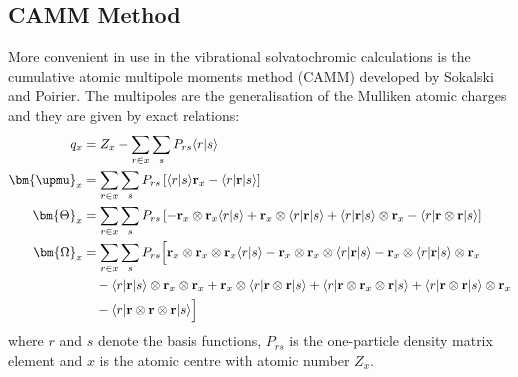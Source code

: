 \documentclass[a4paper,titlepage,twoside,fleqn,12pt]{book}
\begin{document}
\begin{appendices}
\begin{refsection}
\section{CAMM Method}

More convenient in use in the vibrational solvatochromic calculations
is the cumulative atomic multipole
moments method (CAMM) developed by Sokalski and Poirier. \citep{Sokalski.Poirier.CPL.1983}
The multipoles are the generalisation of the Mulliken atomic charges
and they are given by exact relations:
%
\begin{subequations}
\begin{align}
q_x              &=Z_x -\sum_{r\in x} \sum_s  P_{rs} \langle r \rvert s \rangle \\
\bm{\upmu}_x     &= \sum_{r\in x} \sum_s  P_{rs} 
\left[
        \langle r \rvert s \rangle {\bf r}_x - \langle r \lvert {\bf r} \rvert s \rangle
\right]   \\
\bm{\Theta}_{x}  &= \sum_{r\in x} \sum_s P_{rs}
\left[
   - {\bf r}_x \otimes {\bf r}_x \langle r \rvert s \rangle +
    {\bf r}_x \otimes  \langle r \lvert {\bf r} \rvert s \rangle + 
                       \langle r \lvert {\bf r} \rvert s \rangle \otimes {\bf r}_x -
    \langle r \lvert {\bf r} \otimes {\bf r} \rvert s \rangle
\right]   \\
\bm{\Omega}_{x}  &=
\sum_{r\in x} \sum_s P_{rs}
\Big[
          {\bf r}_x \otimes {\bf r}_x \otimes {\bf r}_x \langle r \rvert s \rangle -
          {\bf r}_x \otimes {\bf r}_x \otimes \langle r \lvert {\bf r} \rvert s \rangle -
          {\bf r}_x \otimes \langle r \lvert {\bf r} \rvert s \rangle \otimes {\bf r}_x \nonumber \\ 
 &\quad- \langle r \lvert {\bf r} \rvert s \rangle \otimes {\bf r}_x \otimes {\bf r}_x +
          {\bf r}_x \otimes \langle r \lvert {\bf r} \otimes {\bf r} \rvert s \rangle +
          \langle r \lvert {\bf r} \otimes {\bf r}_x \otimes {\bf r} \rvert s \rangle +
          \langle r \lvert {\bf r} \otimes {\bf r} \rvert s \rangle \otimes {\bf r}_x \nonumber \\ 
 &\quad- \langle r \lvert {\bf r} \otimes {\bf r} \otimes {\bf r} \rvert s \rangle
\Big] 
\end{align}
\end{subequations}
%
where $r$ and $s$ denote the basis functions, $P_{rs}$ is the
one\hyp{}particle density matrix element and $x$ is the atomic centre
with atomic number $Z_x$.

\end{refsection}
\end{appendices}
\end{document}
